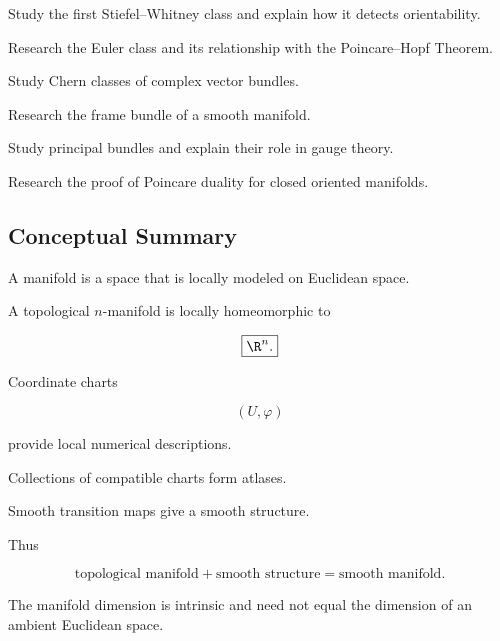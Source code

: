 \begin{exercise}[4]
Study the first Stiefel--Whitney class and explain how it detects
orientability.
\end{exercise}

\begin{exercise}[4]
Research the Euler class and its relationship with the Poincare--Hopf
Theorem.
\end{exercise}

\begin{exercise}[4]
Study Chern classes of complex vector bundles.
\end{exercise}

\begin{exercise}[4]
Research the frame bundle of a smooth manifold.
\end{exercise}

\begin{exercise}[4]
Study principal bundles and explain their role in gauge theory.
\end{exercise}

\begin{exercise}[4]
Research the proof of Poincare duality for closed oriented manifolds.
\end{exercise}

\subsection{Conceptual Summary}
\label{subsec:manifolds-summary}

A manifold is a space that is locally modeled on Euclidean space.

A topological \(n\)-manifold is locally homeomorphic to

\[
\boxed{
\R^n.
}
\]

Coordinate charts

\[
(U,\varphi)
\]

provide local numerical descriptions.

Collections of compatible charts form atlases.

Smooth transition maps give a smooth structure.

Thus

\[
\boxed{
\text{topological manifold}
+
\text{smooth structure}
=
\text{smooth manifold}.
}
\]

The manifold dimension is intrinsic and need not equal the dimension of an
ambient Euclidean space.

